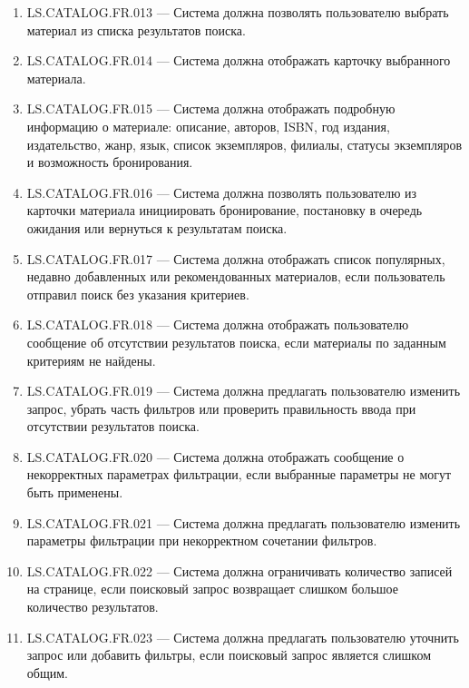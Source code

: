 \documentclass[12pt,a4paper]{article}
\begin{document}
\begin{enumerate}
		\item LS.CATALOG.FR.013 --- Система должна позволять пользователю выбрать
		материал из списка результатов поиска.
		
		\item LS.CATALOG.FR.014 --- Система должна отображать карточку выбранного
		материала.
		
		\item LS.CATALOG.FR.015 --- Система должна отображать подробную информацию
		о материале: описание, авторов, ISBN, год издания, издательство, жанр, язык,
		список экземпляров, филиалы, статусы экземпляров и возможность бронирования.
		
		\item LS.CATALOG.FR.016 --- Система должна позволять пользователю из карточки
		материала инициировать бронирование, постановку в очередь ожидания или
		вернуться к результатам поиска.
		
		\item LS.CATALOG.FR.017 --- Система должна отображать список популярных,
		недавно добавленных или рекомендованных материалов, если пользователь
		отправил поиск без указания критериев.
		
		\item LS.CATALOG.FR.018 --- Система должна отображать пользователю сообщение
		об отсутствии результатов поиска, если материалы по заданным критериям не
		найдены.
		
		\item LS.CATALOG.FR.019 --- Система должна предлагать пользователю изменить
		запрос, убрать часть фильтров или проверить правильность ввода при отсутствии
		результатов поиска.
		
		\item LS.CATALOG.FR.020 --- Система должна отображать сообщение о
		некорректных параметрах фильтрации, если выбранные параметры не могут быть
		применены.
		
		\item LS.CATALOG.FR.021 --- Система должна предлагать пользователю изменить
		параметры фильтрации при некорректном сочетании фильтров.
		
		\item LS.CATALOG.FR.022 --- Система должна ограничивать количество записей
		на странице, если поисковый запрос возвращает слишком большое количество
		результатов.
		
		\item LS.CATALOG.FR.023 --- Система должна предлагать пользователю уточнить
		запрос или добавить фильтры, если поисковый запрос является слишком общим.
		

\end{enumerate}
\end{document}
